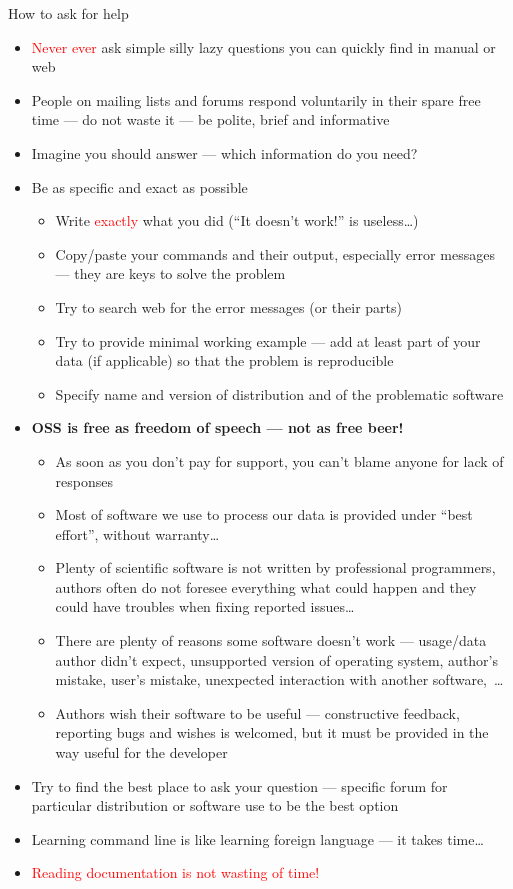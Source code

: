 \documentclass[compress, xelatex, 11pt, xcolor=svgnames, aspectratio=169, url={hyphens, lowtilde}]{beamer}
\renewcommand{\alert}[1]{\textcolor{red}{#1}}
\begin{document}
\begin{frame}[allowframebreaks]{How to ask for help}
	\label{howtoask}
	\begin{itemize}
		\item \alert{Never ever} ask simple silly lazy questions you can quickly find in manual or web
		\item People on mailing lists and forums respond voluntarily in their spare free time --- do not waste it --- be polite, brief and informative
		\item Imagine you should answer --- which information do you need?
		\item Be as specific and exact as possible
		\begin{itemize}
			\item Write \alert{exactly} what you did (\enquote{It doesn't work!} is useless\ldots)
			\item Copy/paste your commands and their output, especially error messages --- they are keys to solve the problem
			\item Try to search web for the error messages (or their parts)
			\item Try to provide minimal working example --- add at least part of your data (if applicable) so that the problem is reproducible
			\item Specify name and version of distribution and of the problematic software
		\end{itemize}
		\item \textbf{OSS is free as freedom of speech --- not as free beer!}
		\begin{itemize}
			\item As soon as you don't pay for support, you can't blame anyone for lack of responses
			\item Most of software we use to process our data is provided under \enquote{best effort}, without warranty\ldots
			\item Plenty of scientific software is not written by professional programmers, authors often do not foresee everything what could happen and they could have troubles when fixing reported issues\ldots
			\item There are plenty of reasons some software doesn't work --- usage/data author didn't expect, unsupported version of operating system, author's mistake, user's mistake, unexpected interaction with another software,~\ldots
			\item Authors wish their software to be useful --- constructive feedback, reporting bugs and wishes is welcomed, but it must be provided in the way useful for the developer
		\end{itemize}
		\item Try to find the best place to ask your question --- specific forum for particular distribution or software use to be the best option
		\item Learning command line is like learning foreign language --- it takes time\ldots
		\item \alert{Reading documentation is not wasting of time!}
	\end{itemize}
\end{frame}
\end{document}
